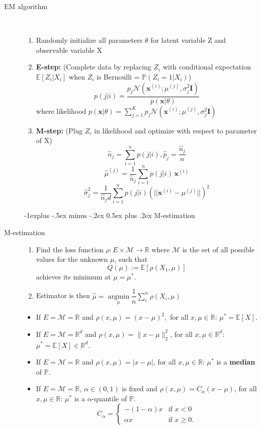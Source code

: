 \documentclass[a4paper, 10pt,landscape]{article}
\makeatletter
\DeclareMathOperator*{\argmin}{argmin}
\renewcommand{\subsection}{\@startsection{subsection}{2}{0mm}%
                                {-1explus -.5ex minus -.2ex}%
                                {0.5ex plus .2ex}%
                                {\normalfont\normalsize\bfseries}}
\makeatother
\begin{document}
\begin{multicols*}{3}
\begin{description}
	\item[EM algorithm]~
		\begin{enumerate}
		\item[] Randomly initialize all parameters $\theta$ for latent variable Z and observable variable X
		\item {\bf E-step:} (Complete data by replacing $Z_i$ with conditional expectation  $\mathbb{E}[Z_i|X_i]$ when $Z_i$ is Bernoulli = $\mathbb{P}(Z_i=1|X_i)$)
			$$p(j|i)=\dfrac{p_j\mathcal{N}\left(\mathbf{x}^{(i)};\mu^{(j)},\sigma^2_j\mathbf{I}\right)}{p\left(\mathbf{x}|\theta\right)}$$
			where likelihood $p(\mathbf{x}|\theta)=\sum\limits_{j=1}^{K}p_j\mathcal{N}\left(\mathbf{x}^{(i)};\mu^{(j)},\sigma^2_j\mathbf{I}\right)$
		\item {\bf M-step:} (Plug $Z_i$ in likelihood and optimize with respect to parameter of X)
			$$\widehat{n}_j=\sum_{i=1}^{n}p(j|i), \widehat{p}_j=\dfrac{\widehat{n}_j}{n}$$
			$$\widehat{\mu}^{(j)}=\dfrac{1}{\widehat{n}_j}\sum_{i=1}^{n}p(j|i)\,\mathbf{x}^{(i)}$$
			$$\widehat{\sigma}^2_j=\dfrac{1}{\widehat{n}_jd}\sum_{i=1}^{n}p(j|i) (||\mathbf{x}^{(i)}-\mu^{(j)} ||)^2$$
		\end{enumerate}

\subsection{M-estimation}
	\item[M-estimation]
		\begin{enumerate}
			
			\item Find the loss function $\rho:E\times\mathcal{M}\rightarrow\mathbb{R}$  where $\mathcal{M}$ is the set of all possible values for the unknown $\mu$, such that $$Q(\mu):=\mathbb{E}\left[\rho\left(X_1,\mu\right)\right]$$ achieves its minimum at $\mu=\mu^*$.
			\item Estimator is then $\widehat{\mu}=\argmin\limits_{\mu}\dfrac{1}{n} \sum_i^n \rho(X_i, \mu)$
		\end{enumerate}

		\begin{itemize}
		\item If $E=\mathcal{M}=\mathbb{R}$ and $\rho(x,\mu)=(x-\mu)^2,$ for all $x,\mu\in\mathbb{R}$: $\mu^*=\mathbb{E}\left[X\right]$.
		\item If $E=\mathcal{M}=\mathbb{R}^d$ and $\rho(x,\mu)=\lVert x-\mu\rVert_2^2$, for all $x,\mu\in\mathbb{R}^d$: $\mu^*=\mathbb{E}\left[X\right]\in\mathbb{R}^d$.
		\item If $E=\mathcal{M}=\mathbb{R}$ and $\rho(x,\mu)=|x-\mu|$, for all $x,\mu\in\mathbb{R}$: $\mu^*$ is a {\bf median} of $\mathbb{P}$.
		\item If $E=\mathcal{M}=\mathbb{R}$, $\alpha\in(0,1)$ is fixed and $\rho(x,\mu)=C_\alpha(x-\mu)$, for all $x,\mu\in\mathbb{R}$: $\mu^*$ is a $\alpha$-quantile of $\mathbb{P}$.
			$$C_\alpha=\begin{cases}
			-(1-\alpha)x&\text{if }x<0\\
			\alpha x&\text{if }x\geq0.
			\end{cases}$$
		\end{itemize}


\end{description}
\end{multicols*}
\end{document}
